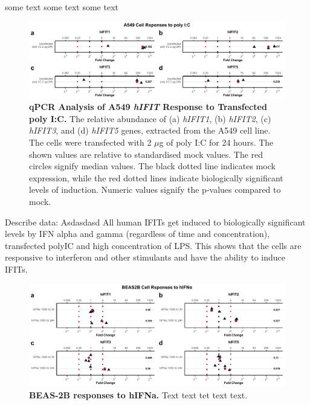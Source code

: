 some text some text some text


\begin{figure}
    \centering
    \includegraphics[width=1\linewidth]{06. Chapter 1/Figs/01. Induction/04. a549_treat_polyic.pdf}
    \caption[qPCR Analysis of A549 \textit{hIFIT} Response to Transfected poly I:C.]{\textbf{qPCR Analysis of A549 \textit{hIFIT} Response to Transfected poly I:C.} The relative abundance of (a) \textit{hIFIT1}, (b) \textit{hIFIT2}, (c) \textit{hIFIT3}, and (d) \textit{hIFIT5} genes, extracted from the A549 cell line. The cells were transfected with 2 \(\mu\)g of poly I:C for 24 hours. The shown values are relative to standardised mock values. The red circles signify median values. The black dotted line indicates mock expression, while the red dotted lines indicate biologically significant levels of induction. Numeric values signify the p-values compared to mock.}
    \label{A549 Response to poly I:C}
\end{figure}

Describe data: \newline
Asdasdasd \newline
All human IFITs get induced to biologically significant levels    by IFN alpha and gamma (regardless of time and concentration), transfected polyIC and high concentration of LPS. This shows that the cells are responsive to interferon and other stimulants and have the ability to induce IFITs.


\begin{figure}
    \centering
    \includegraphics[width=1\linewidth]{06. Chapter 1/Figs/01. Induction/09. beas2b_ifna.pdf}
    \caption[BEAS-2B responses to hIFNa.]{\textbf{BEAS-2B responses to hIFNa.} Text text tet text text.}
    \label{BEAS-2B responses to hIFNa.}
\end{figure}

